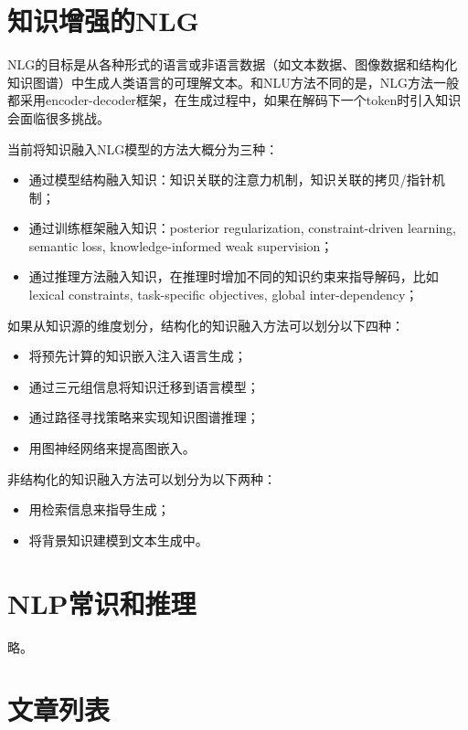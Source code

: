 \documentclass[12pt]{article}
\begin{document}
\section{知识增强的NLG}

NLG的目标是从各种形式的语言或非语言数据（如文本数据、图像数据和结构化知识图谱）中生成人类语言的可理解文本。和NLU方法不同的是，NLG方法一般都采用encoder-decoder框架，在生成过程中，如果在解码下一个token时引入知识会面临很多挑战。

当前将知识融入NLG模型的方法大概分为三种：

\begin{itemize}
    \item 通过模型结构融入知识：知识关联的注意力机制，知识关联的拷贝/指针机制；
    \item 通过训练框架融入知识：posterior regularization, constraint-driven learning, semantic loss, knowledge-informed weak supervision；
    \item 通过推理方法融入知识，在推理时增加不同的知识约束来指导解码，比如lexical constraints, task-specific objectives, global inter-dependency；
\end{itemize}

如果从知识源的维度划分，结构化的知识融入方法可以划分以下四种：

\begin{itemize}
    \item 将预先计算的知识嵌入注入语言生成；
    \item 通过三元组信息将知识迁移到语言模型；
    \item 通过路径寻找策略来实现知识图谱推理；
    \item 用图神经网络来提高图嵌入。
\end{itemize}

非结构化的知识融入方法可以划分为以下两种：

\begin{itemize}
    \item 用检索信息来指导生成；
    \item 将背景知识建模到文本生成中。
\end{itemize}

\section{NLP常识和推理}

略。

\section{文章列表}
\end{document}
